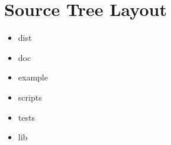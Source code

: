 \section{Source Tree Layout}


\begin{itemize}
  \item dist
  \item doc
  \item example
  \item scripts
  \item tests
\end{itemize}


\begin{itemize}
  \item lib
\end{itemize}











